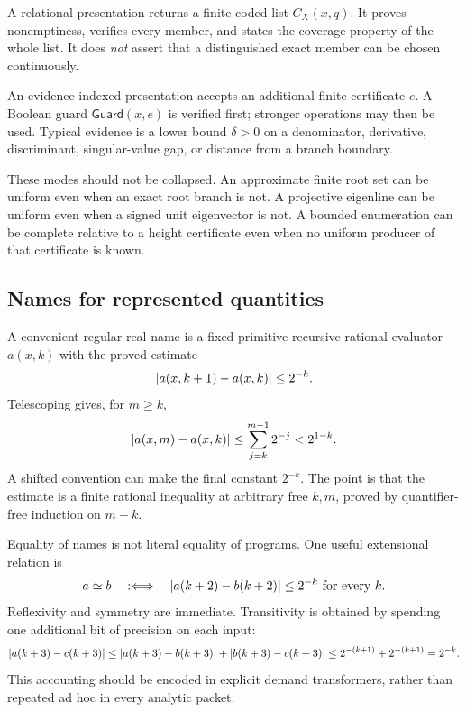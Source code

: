 \begin{definition}
A relational presentation returns a finite coded list
\(C_X(x,q)\).  It proves nonemptiness, verifies every member, and states the
coverage property of the whole list.  It does \emph{not} assert that a
distinguished exact member can be chosen continuously.
\end{definition}

\begin{definition}
An evidence-indexed presentation accepts an additional finite certificate
\(e\).  A Boolean guard \(\mathsf{Guard}(x,e)\) is verified first; stronger
operations may then be used.  Typical evidence is a lower bound
\(\delta>0\) on a denominator, derivative, discriminant, singular-value gap,
or distance from a branch boundary.
\end{definition}

These modes should not be collapsed.  An approximate finite root set can be
uniform even when an exact root branch is not.  A projective eigenline can be
uniform even when a signed unit eigenvector is not.  A bounded enumeration can
be complete relative to a height certificate even when no uniform producer of
that certificate is known.

\subsection{Names for represented quantities}

A convenient regular real name is a fixed primitive-recursive rational
evaluator \(a(x,k)\) with the proved estimate
\[
        \lvert a(x,k+1)-a(x,k)\rvert\le 2^{-k}.
\]
Telescoping gives, for \(m\ge k\),
\[
        \lvert a(x,m)-a(x,k)\rvert
          \le \sum_{j=k}^{m-1}2^{-j}
          < 2^{1-k}.
\]
A shifted convention can make the final constant \(2^{-k}\).  The point is
that the estimate is a finite rational inequality at arbitrary free
\(k,m\), proved by quantifier-free induction on \(m-k\).

Equality of names is not literal equality of programs.  One useful
extensional relation is
\[
   a\simeq b
   \quad:\Longleftrightarrow\quad
   \lvert a(k+2)-b(k+2)\rvert\le 2^{-k}
   \text{ for every }k.
\]
Reflexivity and symmetry are immediate.  Transitivity is obtained by spending
one additional bit of precision on each input:
\[
 \lvert a(k+3)-c(k+3)\rvert
 \le \lvert a(k+3)-b(k+3)\rvert
    +\lvert b(k+3)-c(k+3)\rvert
 \le 2^{-(k+1)}+2^{-(k+1)}=2^{-k}.
\]
This accounting should be encoded in explicit demand transformers, rather
than repeated ad hoc in every analytic packet.

